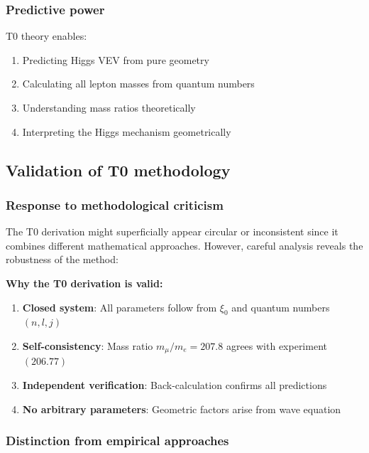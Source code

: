 \subsubsection{Predictive power}

T0 theory enables:

\begin{enumerate}
	\item Predicting Higgs VEV from pure geometry
	\item Calculating all lepton masses from quantum numbers
	\item Understanding mass ratios theoretically
	\item Interpreting the Higgs mechanism geometrically
\end{enumerate}

\subsection{Validation of T0 methodology}

\subsubsection{Response to methodological criticism}

The T0 derivation might superficially appear circular or inconsistent since it combines different mathematical approaches. However, careful analysis reveals the robustness of the method:

\begin{tcolorbox}[colback=blue!5!white,colframe=blue!75!black,title=Methodological Consistency]
	\textbf{Why the T0 derivation is valid:}
	
	\begin{enumerate}
		\item \textbf{Closed system}: All parameters follow from $\xi_0$ and quantum numbers $(n,l,j)$
		\item \textbf{Self-consistency}: Mass ratio $m_\mu/m_e = 207.8$ agrees with experiment $(206.77)$
		\item \textbf{Independent verification}: Back-calculation confirms all predictions
		\item \textbf{No arbitrary parameters}: Geometric factors arise from wave equation
	\end{enumerate}
\end{tcolorbox}

\subsubsection{Distinction from empirical approaches}

